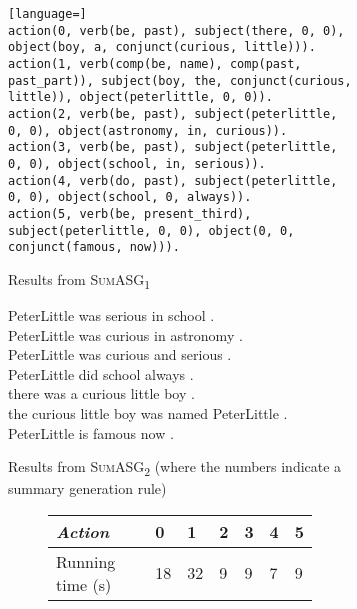\begin{figure}[H]
\begin{subfigure}{\textwidth}
\begin{displayquote}
\begin{lstlisting}[language=]
action(0, verb(be, past), subject(there, 0, 0), object(boy, a, conjunct(curious, little))).
action(1, verb(comp(be, name), comp(past, past_part)), subject(boy, the, conjunct(curious, little)), object(peterlittle, 0, 0)).
action(2, verb(be, past), subject(peterlittle, 0, 0), object(astronomy, in, curious)).
action(3, verb(be, past), subject(peterlittle, 0, 0), object(school, in, serious)).
action(4, verb(do, past), subject(peterlittle, 0, 0), object(school, 0, always)).
action(5, verb(be, present_third), subject(peterlittle, 0, 0), object(0, 0, conjunct(famous, now))).
\end{lstlisting}
\end{displayquote}
\caption{Results from \textsc{SumASG\textsubscript{1}}}
\end{subfigure}
\begin{subfigure}{\textwidth}
\vspace{\baselineskip}
\begin{displayquote}
 PeterLittle was serious in school .\\
 PeterLittle was curious in astronomy .\\
 PeterLittle was curious and serious .\\
 PeterLittle did school always .\\
 there was a curious little boy .\\
 the curious little boy was named PeterLittle .\\
 PeterLittle is famous now .
\end{displayquote}
\caption{Results from \textsc{SumASG\textsubscript{2}} (where the numbers indicate a summary generation rule)}
\vspace{\baselineskip}
\end{subfigure}
\setcounter{subfigure}{0}
\begin{subfigure}{\textwidth}
\begin{subfigure}{0.6\textwidth}
\renewcommand\thesubfigure{\roman{subfigure}}
\centering
\begin{tabular}{@{}lllllll@{}}
\toprule
\textit{Action}         & 0  & 1  & 2 & 3 & 4 & 5 \\ \midrule
Running time (s) & 18 & 32 & 9 & 9 & 7 & 9 \\ \bottomrule

\end{tabular}
\end{subfigure}
\end{subfigure}
\end{figure}
